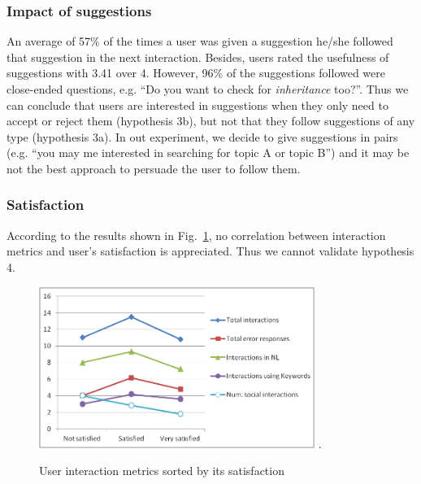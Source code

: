 \subsubsection{Impact of suggestions}

An average of 57\% of the times a user was given a suggestion he/she followed that suggestion in the next interaction. Besides, users rated the usefulness of suggestions with 3.41 over 4. However, 96\% of the suggestions followed were close-ended questions, e.g. ``Do you want to check for {\em inheritance} too?''. Thus we can conclude that users are interested in suggestions when they only need to accept or reject them (hypothesis 3b), but not that they follow suggestions of any type (hypothesis 3a). In out experiment, we decide to give suggestions in pairs (e.g. ``you may me interested in searching for topic A or topic B'') and it may be not the best approach to persuade the user to follow them.


\subsubsection{Satisfaction}

According to the results shown in Fig.~\ref{fig:exp_satisfaction}, no correlation between interaction metrics and user's satisfaction is appreciated. Thus we cannot validate hypothesis 4. 

\begin{figure}[!tbh]
  \centering
  \includegraphics[width=0.8\textwidth]{img/test/exp_satisfaction.png}
  \DeclareGraphicsExtensions.  
  \caption{User interaction metrics sorted by its satisfaction}
  \label{fig:exp_satisfaction}
\end{figure}



